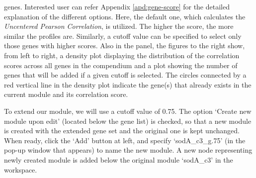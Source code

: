 \begin{small}
genes. Interested user can refer Appendix \ref{apd:gene-score} for the
detailed explanation of the different options.  Here, the default one, which
calculates the \textit{Uncentered Pearson Correlation}, is utilized.  The
higher the score, the more similar the profiles are.  Similarly, a cutoff
value can be specified to select only those genes with higher scores.
%
Also in the panel, the figures to the right
show, from left to right, a density plot displaying the distribution of the
correlation scores across all genes in the compendium and a plot showing the
number of genes that will be added if a given cutoff is selected. The circles
connected by a red vertical line in the density plot indicate the gene(s) that
already exists in the current module and its correlation score.

To extend our module, we will use a cutoff value of 0.75.
%
The option `Create new module upon edit' (located below the gene list) is
checked, so that a new module is created with the extended gene set and the
original one is kept unchanged.
%
When ready, click the `Add' button at left, and specify `sodA\_c3\_g.75' (in
the pop-up window that appears) to name the new module.  A new node
representing newly created module is added below the original module
`sodA\_c3' in the workspace.
%
\end{small} %

